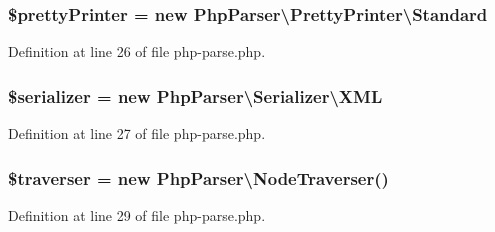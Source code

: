 \subsubsection[{\$pretty\+Printer}]{\setlength{\rightskip}{0pt plus 5cm}\$pretty\+Printer = new {\bf Php\+Parser\textbackslash{}\+Pretty\+Printer\textbackslash{}\+Standard}}\label{php-parse_8php_ad60560760fcc21e1c22d8e484640b0b7}


Definition at line 26 of file php-\/parse.\+php.

\subsubsection[{\$serializer}]{\setlength{\rightskip}{0pt plus 5cm}\$serializer = new {\bf Php\+Parser\textbackslash{}\+Serializer\textbackslash{}\+X\+M\+L}}\label{php-parse_8php_a28c67e2682522dbcaa99e6b438bdbfdd}


Definition at line 27 of file php-\/parse.\+php.

\subsubsection[{\$traverser}]{\setlength{\rightskip}{0pt plus 5cm}\$traverser = new {\bf Php\+Parser\textbackslash{}\+Node\+Traverser}()}\label{php-parse_8php_ae6725770c4bf11723bd3586bc0699c82}


Definition at line 29 of file php-\/parse.\+php.

